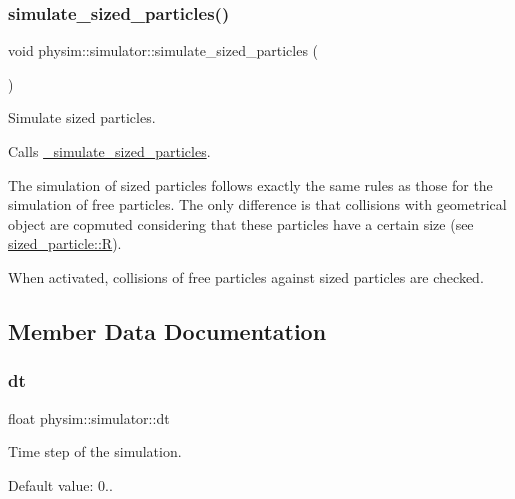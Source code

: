 \subsubsection{\texorpdfstring{simulate\+\_\+sized\+\_\+particles()}{simulate\_sized\_particles()}}
{\footnotesize\ttfamily void physim\+::simulator\+::simulate\+\_\+sized\+\_\+particles (\begin{DoxyParamCaption}{ }\end{DoxyParamCaption})}



Simulate sized particles. 

Calls \hyperlink{classphysim_1_1simulator_a04922992cda3b1c402da7041324c6049}{\+\_\+simulate\+\_\+sized\+\_\+particles}.

The simulation of sized particles follows exactly the same rules as those for the simulation of free particles. The only difference is that collisions with geometrical object are copmuted considering that these particles have a certain size (see \hyperlink{classphysim_1_1particles_1_1sized__particle_ac67d5df84b91bb12152c8691dd43e98c}{sized\+\_\+particle\+::R}).

When activated, collisions of free particles against sized particles are checked. 

\subsection{Member Data Documentation}
\mbox{\label{classphysim_1_1simulator_a12a60d0ed819937b51ce50162dbdd6e1}} 
\subsubsection{\texorpdfstring{dt}{dt}}
{\footnotesize\ttfamily float physim\+::simulator\+::dt\hspace{0.3cm}{\ttfamily [private]}}



Time step of the simulation. 

Default value\+: 0.. \mbox{\label{classphysim_1_1simulator_a05e2840fc39c644d7005ea938e63202f}} 
